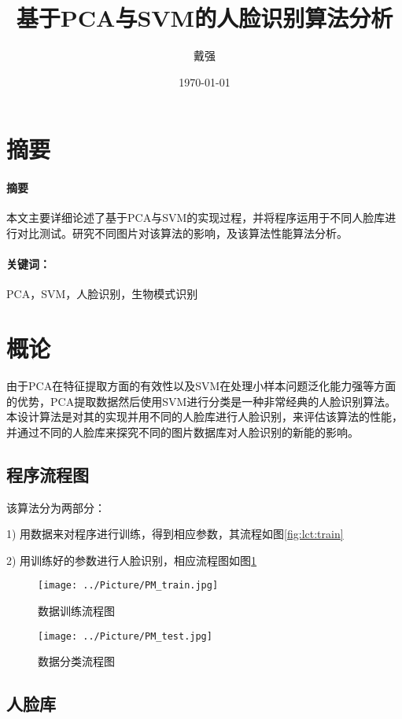 \documentclass[a4paper,12pt]{ctexart}
\title{基于PCA与SVM的人脸识别算法分析}
\author{戴强}
\date{\today}
\renewenvironment*{abstract}[1]{%
\newcommand\gjc{#1}
\paragraph{摘要}
}{\paragraph{关键词：}\gjc }
\begin{document}
\maketitle

\section{摘要}
\label{sec:zhaiyao}

\begin{abstract}{PCA，SVM，人脸识别，生物模式识别}
  本文主要详细论述了基于PCA与SVM的实现过程，并将程序运用于不同人脸库进行对比测试。研究不同图片对该算法的影响，及该算法性能算法分析。
\end{abstract}


\newpage


\tableofcontents

\newpage


\section{概论}
由于PCA在特征提取方面的有效性以及SVM在处理小样本问题泛化能力强等方面的优势，PCA提取数据然后使用SVM进行分类是一种非常经典的人脸识别算法。本设计算法是对其的实现并用不同的人脸库进行人脸识别，来评估该算法的性能，并通过不同的人脸库来探究不同的图片数据库对人脸识别的新能的影响。

\subsection{程序流程图}
该算法分为两部分：

1) 用数据来对程序进行训练，得到相应参数，其流程如图\ref{fig:lct:train}

2) 用训练好的参数进行人脸识别，相应流程图如图\ref{fig:lct:test}
\begin{figure}[htb]
\begin{minipage}[t]{0.5\linewidth}
\centering
\texttt{[image: ../Picture/PM\_train.jpg]}
\caption{数据训练流程图}
\label{fig:lct:train}
\end{minipage}%
\begin{minipage}[t]{0.5\linewidth}
\centering
\texttt{[image: ../Picture/PM\_test.jpg]}
\caption{数据分类流程图}
\label{fig:lct:test}
\end{minipage}
\end{figure}

\subsection{人脸库}
\end{document}
